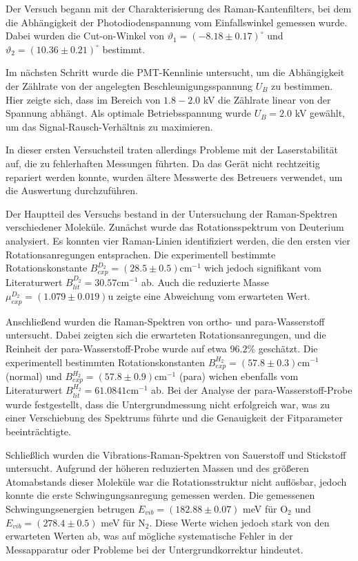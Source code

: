 \documentclass[11pt]{article}
\begin{document}
Der Versuch begann mit der Charakterisierung des Raman-Kantenfilters, bei dem die Abhängigkeit der Photodiodenspannung vom Einfallswinkel gemessen wurde. Dabei wurden die Cut-on-Winkel von $\vartheta_1 = \left(-8.18\pm 0.17\right)^\circ$ und $\vartheta_2 =\left(10.36\pm 0.21\right)^\circ$ bestimmt. 

Im nächsten Schritt wurde die PMT-Kennlinie untersucht, um die Abhängigkeit der Zählrate von der angelegten Beschleunigungsspannung $U_B$ zu bestimmen. Hier zeigte sich, dass im Bereich von $1.8-2.0$ kV die Zählrate linear von der Spannung abhängt. Als optimale Betriebsspannung wurde $U_B = 2.0$ kV gewählt, um das Signal-Rausch-Verhältnis zu maximieren.

In dieser ersten Versuchsteil traten allerdings Probleme mit der Laserstabilität auf, die zu fehlerhaften Messungen führten. Da das Gerät nicht rechtzeitig repariert werden konnte, wurden ältere Messwerte des Betreuers verwendet, um die Auswertung durchzuführen.

Der Hauptteil des Versuchs bestand in der Untersuchung der Raman-Spektren verschiedener Moleküle. Zunächst wurde das Rotationsspektrum von Deuterium analysiert. Es konnten vier Raman-Linien identifiziert werden, die den ersten vier Rotationsanregungen entsprachen. Die experimentell bestimmte Rotationskonstante $B_{exp}^{D_2} = \left(28.5\pm 0.5\right)\mathrm{cm}^{-1}$ wich jedoch signifikant vom Literaturwert $B_{lit}^{D_2} = 30.57\mathrm{cm}^{-1}$ ab. Auch die reduzierte Masse $\mu_{exp}^{D_2} = \left(1.079\pm0.019\right)$u zeigte eine Abweichung vom erwarteten Wert.


Anschließend wurden die Raman-Spektren von ortho- und para-Wasserstoff untersucht. Dabei zeigten sich die erwarteten Rotationsanregungen, und die Reinheit der para-Wasserstoff-Probe wurde auf etwa $96.2\%$ geschätzt. Die experimentell bestimmten Rotationskonstanten $B_{exp}^{H_2} = \left(57.8\pm0.3\right)\mathrm{cm}^{-1}$ (normal) und $B_{exp}^{H_2} = \left(57.8\pm0.9\right)\mathrm{cm}^{-1}$ (para) wichen ebenfalls vom Literaturwert $B_{lit}^{H_2} = 61.0841\mathrm{cm}^{-1}$ ab. Bei der Analyse der para-Wasserstoff-Probe wurde festgestellt, dass die Untergrundmessung nicht erfolgreich war, was zu einer Verschiebung des Spektrums führte und die Genauigkeit der Fitparameter beeinträchtigte.


Schließlich wurden die Vibrations-Raman-Spektren von Sauerstoff und Stickstoff untersucht. Aufgrund der höheren reduzierten Massen und des größeren Atomabstands dieser Moleküle war die Rotationsstruktur nicht auflösbar, jedoch konnte die erste Schwingungsanregung gemessen werden. Die gemessenen Schwingungsenergien betrugen $E_{vib} =\left(182.88\pm0.07\right)$ meV für O$_2$ und $E_{vib} =\left(278.4\pm0.5\right)$ meV für N$_2$. Diese Werte wichen jedoch stark von den erwarteten Werten ab, was auf mögliche systematische Fehler in der Messapparatur oder Probleme bei der Untergrundkorrektur hindeutet.
\end{document}
